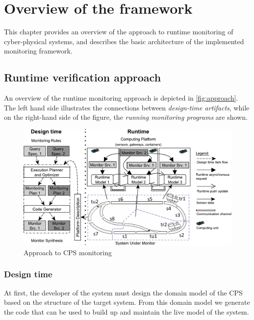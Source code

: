 \chapter{Overview of the framework}


This chapter provides an overview of the approach to runtime monitoring of cyber-physical systems, and describes the basic architecture of the implemented monitoring framework.

\section{Runtime verification approach}

An overview of the runtime monitoring approach is depicted in \autoref{fig:approach}. 
The left hand side illustrates the connections between \emph{design-time artifacts}, while on the right-hand side of the figure, the \emph{running monitoring programs} are shown.

\begin{figure}[h]
	\begin{center}
		\includegraphics[width=\textwidth]{figures/fase-overview-crop.pdf}
		\caption{Approach to CPS monitoring}
		\label{fig:approach}
	\end{center}
\end{figure}

\subsection{Design time}

At first, the developer of the system must design the domain model of the CPS based on the structure of the target system.
From this domain model we generate the code that can be used to build up and maintain the live model of the system.

